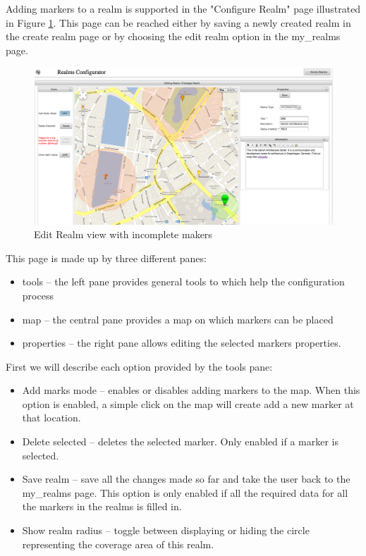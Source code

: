 \noindent Adding markers to a realm is supported in the "Configure Realm" page illustrated in Figure \ref{fig.edit_realm1}. This page can be reached either by saving a newly created realm in the create realm page or by choosing the edit realm option in the my\_realms page.
\begin{figure}[H] 
	\centering
	\includegraphics[width=\linewidth]{fig/edit_realm1.png}
	\caption{Edit Realm view with incomplete makers}
	\label{fig.edit_realm1}
\end{figure}
\noindent This page is made up by three different panes:
\begin{itemize}
	\item tools -- the left pane provides general tools to which help the configuration process
 	\item map -- the central pane provides a map on which markers can be placed
	\item properties -- the right pane allows editing the selected markers properties.
\end{itemize}

\noindent First we will describe each option provided by the tools pane:
\begin{itemize}
	\item Add marks mode -- enables or disables adding markers to the map. When this option is enabled, a simple click on the map will create add a new marker at that location.
	\item Delete selected -- deletes the selected marker. Only enabled if a marker is selected.
	\item Save realm -- save all the changes made so far and take the user back to the my\_realms page. This option is only enabled if all the required data for all the markers in the realms is filled in.
	\item Show realm radius -- toggle between displaying or hiding the circle representing the coverage area of this realm.
\end{itemize}

